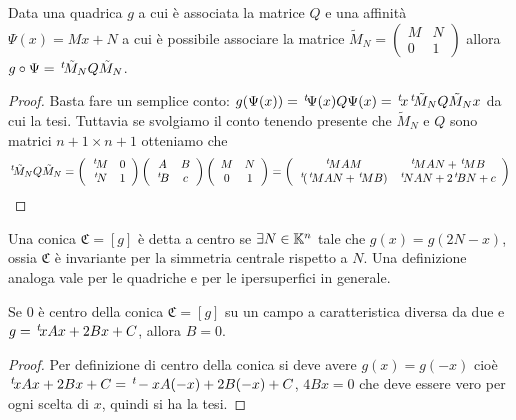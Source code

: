 \begin{lemma}\label{lem:cambioaffine}
	Data una quadrica $g$ a cui è associata la matrice $Q$ e una affinità $\Psi(x)=Mx+N$ a cui è possibile  associare la matrice
	$\tilde M_N = \left(\begin{smallmatrix}
M & N \\ 0 & 1
\end{smallmatrix}
\right)$ allora 
	$g\circ \Psi = \, ^{t}\!\tilde M_NQ \tilde M_N$.
\end{lemma}
\begin{proof}
	Basta fare un semplice conto: $g(\Psi(x))=\, ^{t}\!\Psi(x)Q \Psi(x) = \, ^{t}\!x\, ^{t}\!\tilde M_NQ \tilde M_N x$ da cui la tesi.
	Tuttavia se svolgiamo il conto tenendo presente che  $\tilde M_N$ e $Q$ sono matrici $n+1\times n+1$ otteniamo che
	\[
		\tra{\tilde M_N}Q \tilde M_N = 
		\left(
			\begin{array}{cc}
			\tra{M} & 0\\
			\tra{N} & 1
			\end{array}
		\right)
		\left(
			\begin{array}{cc}
			A & B\\
			\tra{B} & c
			\end{array}
		\right)
		\left(
			\begin{array}{cc}
			M & N\\
			0 & 1
			\end{array}
		\right) =
		\left(
			\begin{array}{cc}
			\tra{M}AM & \tra{M}AN+\tra{M}B\\
			\tra{(\tra{M}AN+\tra{M}B)}& \tra{N}AN+2\tra{B}N+c
			\end{array}
		\right)
	\]

\end{proof}

\begin{definition}
	Una conica $\mathfrak{C}=[g]$ è detta a centro se $\exists N\in \mathbb K^n$ tale che $g(x)=g(2N-x)$, ossia $\mathfrak{C}$ è invariante per la
	simmetria centrale rispetto a $N$. Una definizione analoga vale per le quadriche e per le ipersuperfici in generale.
\end{definition}

\begin{lemma}\label{lem:centroconica}
	Se $0$ è centro della conica $\mathfrak{C}=[g]$ su un campo a caratteristica diversa da due e $g=\, ^{t}\!xAx+2Bx+C$, allora $B=0$.
\end{lemma}

\begin{proof}
	Per definizione di centro della conica si deve avere  $g(x)=g(-x)$ cioè $\, ^{t}\!xAx+2Bx+C=\, ^{t}\!-xA(-x)+2B(-x)+C$, $4Bx=0$ che deve essere vero
	per ogni scelta di $x$, quindi si ha la tesi.
\end{proof}

